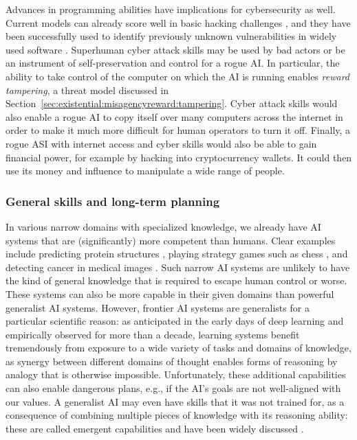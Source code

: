 Advances in programming abilities have implications for cybersecurity as well. Current models can already score well in basic hacking challenges \cite{arxiv.org.abs.2412.02776,arxiv.org.abs.2402.06664}, and they have been successfully used to identify previously unknown vulnerabilities in widely used software \cite{googleprojectzero.blogspot.com.2024.10.from.naptime.to.big.sleep.html}. Superhuman cyber attack skills may be used by bad actors or be an instrument of self-preservation and control for a rogue AI. In particular, the ability to take control of the computer on which the AI is running enables \textit{reward tampering}, a threat model discussed in Section~\ref{sec:existential:misagencyreward:tampering}. Cyber attack skills would also enable a rogue AI to copy itself over many computers across the internet in order to make it much more difficult for human operators to turn it off. Finally, a rogue ASI with internet access and cyber skills would also be able to gain financial power, for example by hacking into cryptocurrency wallets. It could then use its money and influence to manipulate a wide range of people.

    \subsubsection{General skills and long-term planning}
    \label{sec:existential:lossofcontrol:broad-and-long}

In various narrow domains with specialized knowledge, we already have AI systems that are (significantly) more competent than humans. Clear examples include predicting protein structures \cite{www.nature.com.articles.s41586.021.03819.2}, playing strategy games such as chess \cite{www.science.org.doi.10.1126.science.aar6404}, and  detecting cancer in medical images \cite{www.nature.com.articles.s41586.019.1799.6}. Such narrow AI systems are unlikely to have the kind of general knowledge that is required to escape human control or worse. These systems can also be more capable in their given domains than powerful generalist AI systems. However, frontier AI systems are generalists for a particular scientific reason: as anticipated in the early days of deep learning \cite{dl.acm.org.doi.10.1109.tpami.2013.50} and empirically observed for more than a decade, learning systems benefit tremendously from exposure to a wide variety of tasks and domains of knowledge, as synergy between different domains of thought enables forms of reasoning by analogy that is otherwise impossible. Unfortunately, these additional capabilities can also enable dangerous plans, e.g., if the AI’s goals are not well-aligned with our values. A generalist AI may even have skills that it was not trained for, as a consequence of combining multiple pieces of knowledge with its reasoning ability: these are called emergent capabilities and have been widely discussed \cite{openreview.net.forum.id.yzkSU5zdwD,arxiv.org.abs.2303.12712,dl.acm.org.doi.10.5555.3692070.3692121}.

